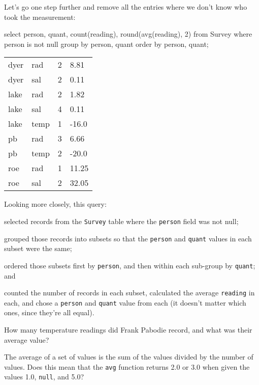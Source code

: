 \documentclass{book}
\begin{document}
Let's go one step further and remove all the entries where we don't know
who took the measurement:

\begin{VerbIn}
select   person, quant, count(reading), round(avg(reading), 2)
from     Survey
where    person is not null
group by person, quant
order by person, quant;
\end{VerbIn}

\begin{tabular}{llll}
dyer & rad & 2 & 8.81 \\
dyer & sal & 2 & 0.11 \\
lake & rad & 2 & 1.82 \\
lake & sal & 4 & 0.11 \\
lake & temp & 1 & -16.0 \\
pb & rad & 3 & 6.66 \\
pb & temp & 2 & -20.0 \\
roe & rad & 1 & 11.25 \\
roe & sal & 2 & 32.05 \\
\end{tabular}

Looking more closely, this query:

\begin{swcenumerate}
\item
  selected records from the \texttt{Survey} table where the
  \texttt{person} field was not null;
\item
  grouped those records into subsets so that the \texttt{person} and
  \texttt{quant} values in each subset were the same;
\item
  ordered those subsets first by \texttt{person}, and then within each
  sub-group by \texttt{quant}; and
\item
  counted the number of records in each subset, calculated the average
  \texttt{reading} in each, and chose a \texttt{person} and
  \texttt{quant} value from each (it doesn't matter which ones, since
  they're all equal).
\end{swcenumerate}

\begin{challenge}
  How many temperature readings did Frank Pabodie record, and what was
  their average value?
\end{challenge}

\begin{challenge}
  The average of a set of values is the sum of the values divided by the
  number of values. Does this mean that the \texttt{avg} function
  returns 2.0 or 3.0 when given the values 1.0, \texttt{null}, and 5.0?
\end{challenge}
\end{document}
